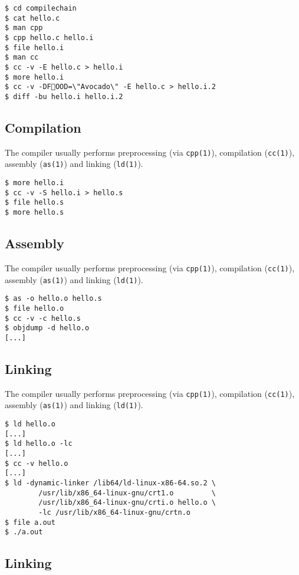 \documentclass[xga]{xdvislides}
\begin{document}
\begin{verbatim}
$ cd compilechain
$ cat hello.c
$ man cpp
$ cpp hello.c hello.i
$ file hello.i
$ man cc
$ cc -v -E hello.c > hello.i
$ more hello.i
$ cc -v -DFOOD=\"Avocado\" -E hello.c > hello.i.2
$ diff -bu hello.i hello.i.2
\end{verbatim}

\subsection{Compilation}

The compiler usually performs preprocessing (via {\tt cpp(1)}), compilation
({\tt cc(1)}), assembly ({\tt as(1)}) and linking ({\tt ld(1)}).

\begin{verbatim}
$ more hello.i
$ cc -v -S hello.i > hello.s
$ file hello.s
$ more hello.s
\end{verbatim}

\subsection{Assembly}

The compiler usually performs preprocessing (via {\tt cpp(1)}), compilation
({\tt cc(1)}), assembly ({\tt as(1)}) and linking ({\tt ld(1)}).

\begin{verbatim}
$ as -o hello.o hello.s
$ file hello.o
$ cc -v -c hello.s
$ objdump -d hello.o
[...]
\end{verbatim}

\subsection{Linking}

The compiler usually performs preprocessing (via {\tt cpp(1)}), compilation
({\tt cc(1)}), assembly ({\tt as(1)}) and linking ({\tt ld(1)}).

\begin{verbatim}
$ ld hello.o
[...]
$ ld hello.o -lc
[...]
$ cc -v hello.o
[...]
$ ld -dynamic-linker /lib64/ld-linux-x86-64.so.2 \
        /usr/lib/x86_64-linux-gnu/crt1.o         \
        /usr/lib/x86_64-linux-gnu/crti.o hello.o \
        -lc /usr/lib/x86_64-linux-gnu/crtn.o
$ file a.out
$ ./a.out
\end{verbatim}

\subsection{Linking}
\end{document}
